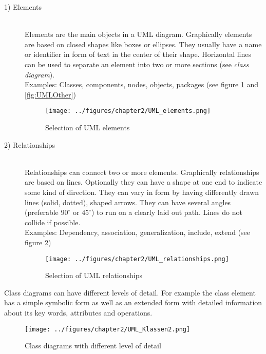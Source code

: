 \documentclass[twoside, openright, 12pt]{book}
\begin{document}
\begin{description}
\item[1) Elements]\hfill \\
Elements are the main objects in a UML diagram.
Graphically elements are based on closed shapes like boxes or ellipses.
They usually have a name or identifier in form of text in the center of their shape. Horizontal lines can be used to separate an element into two or more sections (see \textit{class diagram}). \\
Examples: Classes, components, nodes, objects, packages (see figure \ref{fig:UML_elements} and \ref{fig:UMLOther})

\begin{figure}[htb]
	\centering
	\texttt{[image: ../figures/chapter2/UML\_elements.png]}
	\caption{Selection of UML elements}
	\label{fig:UML_elements}
\end{figure}

\item[2) Relationships]\hfill \\
Relationships can connect two or more elements.
Graphically relationships are based on lines.
Optionally they can have a shape at one end to indicate some kind of direction.
They can vary in form by having differently drawn lines (solid, dotted), shaped arrows.
They can have several angles (preferable $90^{\circ}$ or $45^{\circ}$) to run on a clearly laid out path.
Lines do not collide if possible. \\
Examples: Dependency, association, generalization, include, extend (see figure \ref{fig:UML_relationships})

\begin{figure}[htb]
	\centering
	\texttt{[image: ../figures/chapter2/UML\_relationships.png]}
	\caption{Selection of UML relationships}
	\label{fig:UML_relationships}
\end{figure}
\end{description}

\noindent 
Class diagrams can have different levels of detail.
For example the class element has a simple symbolic form as well as an extended form with detailed information about its key words, attributes and operations.

\begin{figure}[htb]
	\centering
	\texttt{[image: ../figures/chapter2/UML\_Klassen2.png]}
	\caption{Class diagrams with different level of detail}
	\label{fig:Class}
\end{figure}
 
\end{document}
